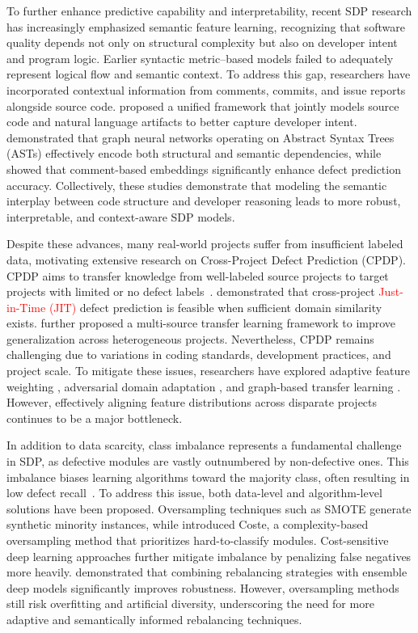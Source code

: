 \documentclass[authoryear,final,5p,times,twocolumn]{elsarticle}
\theoremstyle{plain}
\begin{document}
To further enhance predictive capability and interpretability, recent SDP research has increasingly emphasized semantic feature learning, recognizing that software quality depends not only on structural complexity but also on developer intent and program logic. Earlier syntactic metric–based models failed to adequately represent logical flow and semantic context. To address this gap, researchers have incorporated contextual information from comments, commits, and issue reports alongside source code. \citet{liu2023semantic} proposed a unified framework that jointly models source code and natural language artifacts to better capture developer intent. \citet{xu2020defect} demonstrated that graph neural networks operating on Abstract Syntax Trees (ASTs) effectively encode both structural and semantic dependencies, while \citet{huo2018learning} showed that comment-based embeddings significantly enhance defect prediction accuracy. Collectively, these studies demonstrate that modeling the semantic interplay between code structure and developer reasoning leads to more robust, interpretable, and context-aware SDP models.

Despite these advances, many real-world projects suffer from insufficient labeled data, motivating extensive research on Cross-Project Defect Prediction (CPDP). CPDP aims to transfer knowledge from well-labeled source projects to target projects with limited or no defect labels~\citep{saeed2024cross}. \citet{kamei2016just} demonstrated that cross-project \textcolor{red}{Just-in-Time (JIT)} defect prediction is feasible when sufficient domain similarity exists. \citet{bai2022transfer} further proposed a multi-source transfer learning framework to improve generalization across heterogeneous projects. Nevertheless, CPDP remains challenging due to variations in coding standards, development practices, and project scale. To mitigate these issues, researchers have explored adaptive feature weighting \citep{tong2023array}, adversarial domain adaptation \citep{sheng2020adversarial}, and graph-based transfer learning \citep{xing2022cross}. However, effectively aligning feature distributions across disparate projects continues to be a major bottleneck.

In addition to data scarcity, class imbalance represents a fundamental challenge in SDP, as defective modules are vastly outnumbered by non-defective ones. This imbalance biases learning algorithms toward the majority class, often resulting in low defect recall~\citep{gong2019tackling}. To address this issue, both data-level and algorithm-level solutions have been proposed. Oversampling techniques such as SMOTE \citep{pak2018smote} generate synthetic minority instances, while \citet{feng2021coste} introduced Coste, a complexity-based oversampling method that prioritizes hard-to-classify modules. Cost-sensitive deep learning approaches further mitigate imbalance by penalizing false negatives more heavily. \citet{yedida2021value} demonstrated that combining rebalancing strategies with ensemble deep models significantly improves robustness. However, oversampling methods still risk overfitting and artificial diversity, underscoring the need for more adaptive and semantically informed rebalancing techniques.
\end{document}
